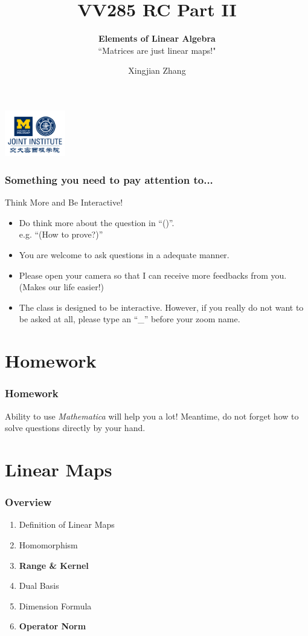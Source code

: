 \documentclass[12pt, t]{beamer}
\title{VV285 RC Part II}
\subtitle{\textbf{Elements of Linear Algebra}\\``Matrices are just linear maps!"}
\institute[UM-SJTU JI]{Univerity of Michigan-Shanghai Jiao Tong University Joint Institute}
\author{Xingjian Zhang}
\begin{document}
\begin{frame}
    \titlepage
    \begin{center}
        \includegraphics[height=2cm]{logo2.png}
    \end{center}
\end{frame}

\begin{frame}
    \frametitle{Something you need to pay attention to...}
    Think More and Be Interactive!
    \begin{itemize}
        \item Do think more about the question in ``()''. \\e.g. ``(How to prove?)''
        \item You are welcome to ask questions in a adequate manner.
        \item Please open your camera so that I can receive more feedbacks from you. (Makes our life easier!)
        \item The class is designed to be interactive. However, if you really do not want to be asked at all, please type an ``\_'' before your zoom name.
    \end{itemize}
\end{frame}

\section{Homework}
\begin{frame}
    \frametitle{Homework}
    Ability to use \textit{Mathematica} will help you a lot! Meantime, do not forget how to solve questions directly by your hand.


\end{frame}

\section{Linear Maps}
\begin{frame}
    \frametitle{Overview}
    \begin{enumerate}
        \item Definition of Linear Maps
        \item Homomorphism
        \item \textbf{Range \& Kernel}
        \item Dual Basis
        \item Dimension Formula
        \item \textbf{Operator Norm}
    \end{enumerate}
\end{frame}
\end{document}
